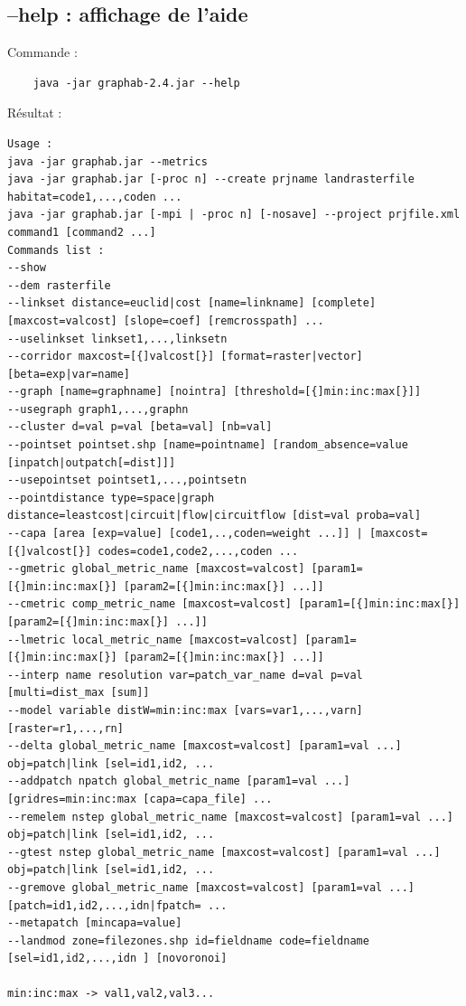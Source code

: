 \documentclass[a4paper,10pt]{report}
\begin{document}
\subsection{--help : affichage de l'aide}
Commande :
\begin{Verbatim}
	java -jar graphab-2.4.jar --help
\end{Verbatim}
Résultat :
\begin{verbatim}
Usage :
java -jar graphab.jar --metrics
java -jar graphab.jar [-proc n] --create prjname landrasterfile habitat=code1,...,coden ...
java -jar graphab.jar [-mpi | -proc n] [-nosave] --project prjfile.xml command1 [command2 ...]
Commands list :
--show
--dem rasterfile
--linkset distance=euclid|cost [name=linkname] [complete] [maxcost=valcost] [slope=coef] [remcrosspath] ...
--uselinkset linkset1,...,linksetn
--corridor maxcost=[{]valcost[}] [format=raster|vector] [beta=exp|var=name]
--graph [name=graphname] [nointra] [threshold=[{]min:inc:max[}]]
--usegraph graph1,...,graphn
--cluster d=val p=val [beta=val] [nb=val]
--pointset pointset.shp [name=pointname] [random_absence=value [inpatch|outpatch[=dist]]]
--usepointset pointset1,...,pointsetn
--pointdistance type=space|graph distance=leastcost|circuit|flow|circuitflow [dist=val proba=val]
--capa [area [exp=value] [code1,..,coden=weight ...]] | [maxcost=[{]valcost[}] codes=code1,code2,...,coden ...
--gmetric global_metric_name [maxcost=valcost] [param1=[{]min:inc:max[}] [param2=[{]min:inc:max[}] ...]]
--cmetric comp_metric_name [maxcost=valcost] [param1=[{]min:inc:max[}] [param2=[{]min:inc:max[}] ...]]
--lmetric local_metric_name [maxcost=valcost] [param1=[{]min:inc:max[}] [param2=[{]min:inc:max[}] ...]]
--interp name resolution var=patch_var_name d=val p=val [multi=dist_max [sum]]
--model variable distW=min:inc:max [vars=var1,...,varn] [raster=r1,...,rn]
--delta global_metric_name [maxcost=valcost] [param1=val ...] obj=patch|link [sel=id1,id2, ...
--addpatch npatch global_metric_name [param1=val ...] [gridres=min:inc:max [capa=capa_file] ...
--remelem nstep global_metric_name [maxcost=valcost] [param1=val ...] obj=patch|link [sel=id1,id2, ...
--gtest nstep global_metric_name [maxcost=valcost] [param1=val ...] obj=patch|link [sel=id1,id2, ...
--gremove global_metric_name [maxcost=valcost] [param1=val ...] [patch=id1,id2,...,idn|fpatch= ...
--metapatch [mincapa=value]
--landmod zone=filezones.shp id=fieldname code=fieldname [sel=id1,id2,...,idn ] [novoronoi]

min:inc:max -> val1,val2,val3...
\end{verbatim}
\end{document}
